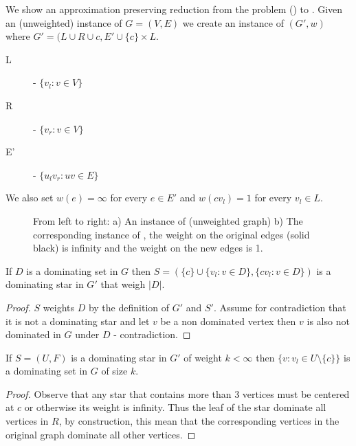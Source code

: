 We show an approximation preserving reduction from the \ProblemDom{} problem (\ProbDom)
to \ProblemStar{}.
Given an (unweighted) instance of \ProbDom{} $G = (V, E)$ we create an instance of \ProbStar{}
$(G', w)$ where $G' = (L \cup R \cup {c}, E' \cup \{c\} \times L$.
\begin{description}
\item[L] - $\{v_l : v \in V\}$
\item[R] - $\{v_r : v \in V\}$
\item[E'] - $\{u_lv_r : uv \in E\}$
\end{description}
We also set $w(e) = \infty$ for every $e \in E'$ and $w(cv_l) = 1$ for every $v_l \in L$.

\begin{figure}
\begin{center}

\end{center}
\caption{\label{fig:star-hardness}
From left to right:
a) An instance of \ProbDom{} (unweighted graph)
b) The corresponding instance of \ProbStar{}, 
the weight on the original edges (solid black) is infinity 
and the weight on the new edges is 1. 
}
\end{figure} 

\begin{claim}
If $D$ is a dominating set in $G$ then 
$S = (\{c\} \cup \{v_l : v \in D\}, \{cv_l: v \in D\})$ 
is a dominating star in $G'$ that weigh $|D|$. 
\end{claim}

\begin{proof}
$S$ weights $D$ by the definition of $G'$ and $S'$.
Assume for contradiction that it is not a dominating star and let $v$ be a non dominated 
vertex then $v$ is also not dominated in $G$ under $D$ - contradiction.
\end{proof}

\begin{claim}
If $S = (U, F)$ is a dominating star in $G'$ of weight $k < \infty$ 
then $\{v : v_l \in U \setminus \{c\}\}$ is a dominating set in $G$ of size $k$.
\end{claim}

\begin{proof}
Observe that any star that contains more than 3 vertices must be centered at $c$ or otherwise
its weight is infinity.
Thus the leaf of the star dominate all vertices in $R$, by construction, this mean that the
corresponding vertices in the original graph dominate all other vertices.
\end{proof}